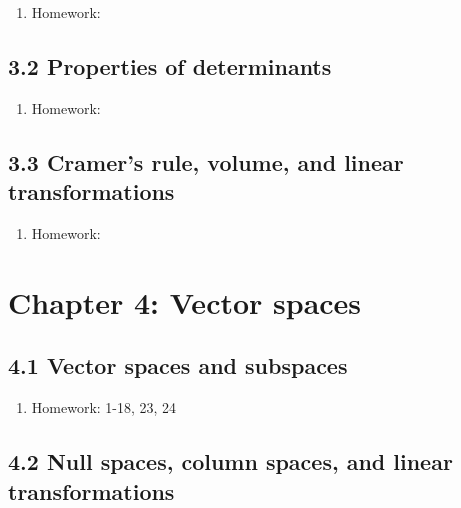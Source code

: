 \documentclass{article}
\begin{document}
\begin{enumerate}

\item Homework: 

\end{enumerate}

\subsection{3.2 Properties of determinants}

\begin{enumerate}

\item Homework: 

\end{enumerate}

\subsection{3.3 Cramer's rule, volume, and linear transformations}

\begin{enumerate}

\item Homework: 

\end{enumerate}


\section{Chapter 4: Vector spaces} 

\subsection{4.1 Vector spaces and subspaces}

\begin{enumerate}

\item Homework: 1-18, 23, 24

\end{enumerate}

\subsection{4.2 Null spaces, column spaces, and linear transformations}
\end{document}
